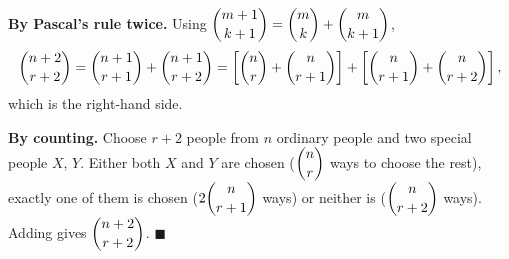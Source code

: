 \textbf{By Pascal's rule twice.} Using $\dbinom{m+1}{k+1}=\dbinom mk+\dbinom m{k+1}$,
\[
\dbinom{n+2}{r+2}=\dbinom{n+1}{r+1}+\dbinom{n+1}{r+2}
=\left[\dbinom nr+\dbinom n{r+1}\right]+\left[\dbinom n{r+1}+\dbinom n{r+2}\right],
\]
which is the right-hand side.

\textbf{By counting.} Choose $r+2$ people from $n$ ordinary people and two special people $X$, $Y$. Either both $X$ and $Y$ are chosen ($\dbinom nr$ ways to choose the rest), exactly one of them is chosen ($2\dbinom n{r+1}$ ways) or neither is ($\dbinom n{r+2}$ ways). Adding gives $\dbinom{n+2}{r+2}$. $\blacksquare$
